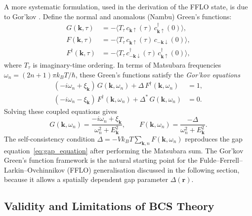 A more systematic formulation, used in the derivation of the FFLO state, is
due to Gor'kov \cite{Gorkov1958}. Define the normal and anomalous (Nambu)
Green's functions:
\begin{align}
	G(\mathbf{k},\tau) &= -\langle T_\tau\, c_{\mathbf{k}\uparrow}(\tau)\,
	c^\dagger_{\mathbf{k}\uparrow}(0)\rangle, \\
	F(\mathbf{k},\tau) &= -\langle T_\tau\, c_{\mathbf{k}\uparrow}(\tau)\,
	c_{-\mathbf{k}\downarrow}(0)\rangle, \\
	F^\dagger(\mathbf{k},\tau) &= -\langle T_\tau\,
	c^\dagger_{-\mathbf{k}\downarrow}(\tau)\,
	c^\dagger_{\mathbf{k}\uparrow}(0)\rangle,
\end{align}
where $T_\tau$ is imaginary-time ordering. In terms of Matsubara frequencies
$\omega_n = (2n+1)\pi k_BT/\hbar$, these Green's functions satisfy the
\emph{Gor'kov equations}
\begin{align}
	(-i\omega_n + \xi_{\mathbf{k}})\,G(\mathbf{k},\omega_n)
	+ \Delta\, F^\dagger(\mathbf{k},\omega_n) &= 1, \\
	(-i\omega_n - \xi_{\mathbf{k}})\,F^\dagger(\mathbf{k},\omega_n)
	+ \Delta^*\, G(\mathbf{k},\omega_n) &= 0.
\end{align}
Solving these coupled equations gives
\begin{equation}
	G(\mathbf{k},\omega_n) = \frac{-i\omega_n + \xi_{\mathbf{k}}}{\omega_n^2
		+ E_{\mathbf{k}}^2}, \qquad
	F(\mathbf{k},\omega_n) = \frac{-\Delta}{\omega_n^2 + E_{\mathbf{k}}^2}.
	\label{eq:Gorkov_solutions}
\end{equation}
The self-consistency condition $\Delta = -V k_B T \sum_{\mathbf{k},n}
F(\mathbf{k},\omega_n)$ reproduces the gap equation~\eqref{eq:gap_equation}
after performing the Matsubara sum. The Gor'kov Green's function framework is
the natural starting point for the Fulde--Ferrell--Larkin--Ovchinnikov (FFLO)
generalisation discussed in the following section, because it allows a
spatially dependent gap parameter $\Delta(\mathbf{r})$.

\subsection{Validity and Limitations of BCS Theory}

